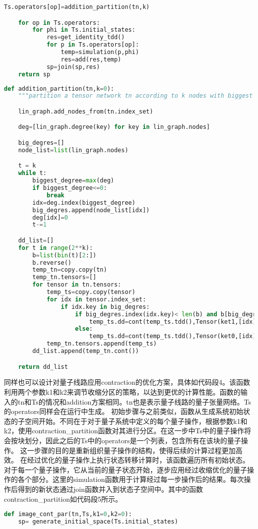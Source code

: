 {\begin{lstlisting}[language=Python, caption=对量子线路应用addition优化方案计算一步迁移]
    Ts.operators[op]=addition_partition(tn,k)

    for op in Ts.operators:
        for phi in Ts.initial_states:
            res=get_identity_tdd()
            for p in Ts.operators[op]:
                temp=simulation(p,phi)
                res=add(res,temp)
            sp=join(sp,res)
    return sp
\end{lstlisting}
\begin{lstlisting}[language=Python, caption={addition方案中的电路划分函数}]
def addition_partition(tn,k=0):
    """partition a tensor network tn according to k nodes with biggest degree"""

    lin_graph.add_nodes_from(tn.index_set)

    deg=[lin_graph.degree(key) for key in lin_graph.nodes]

    big_degres=[]
    node_list=list(lin_graph.nodes)

    t = k
    while t:
        biggest_degree=max(deg)
        if biggest_degree<=0:
            break
        idx=deg.index(biggest_degree)
        big_degres.append(node_list[idx])
        deg[idx]=0
        t-=1

    dd_list=[]
    for t in range(2**k):
        b=list(bin(t)[2:])
        b.reverse()
        temp_tn=copy.copy(tn)
        temp_tn.tensors=[]
        for tensor in tn.tensors:
            temp_ts=copy.copy(tensor)
            for idx in tensor.index_set:
                if idx.key in big_degres:
                    if big_degres.index(idx.key)< len(b) and b[big_degres.index(idx.key)]=='1':
                        temp_ts.dd=cont(temp_ts.tdd(),Tensor(ket1,[idx]).tdd())
                    else:
                        temp_ts.dd=cont(temp_ts.tdd(),Tensor(ket0,[idx]).tdd())
            temp_tn.tensors.append(temp_ts)
        dd_list.append(temp_tn.cont())

    return dd_list
\end{lstlisting}


同样也可以设计对量子线路应用contraction的优化方案，具体如代码段4。该函数利用两个参数k1和k2来调节收缩分区的策略，以达到更优的计算性能。函数的输入的tn和Ts的情况和addition方案相同。tn也是表示量子线路的量子张量网络。Ts的operators同样会在运行中生成。
初始步骤与之前类似，函数从生成系统初始状态的子空间开始。不同在于对于量子系统中定义的每个量子操作，根据参数k1和k2，使用contraction\_partition函数对其进行分区。在这一步中Ts中的量子操作将会按块划分，因此之后的Ts中的operators是一个列表，包含所有在该块的量子操作。
这一步骤的目的是重新组织量子操作的结构，使得后续的计算过程更加高效。
在经过优化的量子操作上执行状态转移计算时，该函数遍历所有初始状态。对于每一个量子操作，它从当前的量子状态开始，逐步应用经过收缩优化的量子操作的各个部分。这里的simulation函数用于计算经过每一步操作后的结果。每次操作后得到的新状态通过join函数并入到状态子空间中。其中的函数contraction\_partition如代码段5所示。
\begin{lstlisting}[language=Python, caption=对量子线路应用contraction优化方案计算一步迁移]
def image_cont_par(tn,Ts,k1=0,k2=0):
    sp= generate_initial_space(Ts.initial_states)


\end{lstlisting}}
